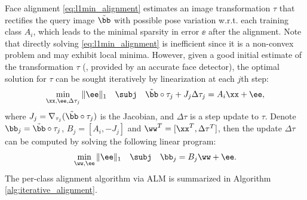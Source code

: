 Face alignment \eqref{eq:l1min_alignment} estimates an image transformation
$\tau$ that rectifies the query image $\tilde{\bb}$ with possible pose
variation w.r.t. each training class $A_i$, which leads to the minimal sparsity
in error $\ee$ after the alignment. Note that directly solving
\eqref{eq:l1min_alignment} is inefficient since it is a non-convex problem
and may exhibit local minima.
However, given a good initial estimate of the
transformation $\tau$ (\eg, provided by an accurate face detector), the optimal
solution for $\tau$ can be sought iteratively by linearization at each $j$th
step:
\begin{equation}
\min_{\xx, \ee, \Delta \tau_j}\|\ee\|_1\quad \subj\quad \tilde\bb\circ\tau_j +  J_j\Delta \tau_j = A_i\xx + \ee,
\end{equation}
where $J_j = \nabla_{\tau_j}(\tilde\bb\circ\tau_j)$ is the Jacobian, and
$\Delta \tau$ is a step update to $\tau$. Denote $\bb_j =
\tilde\bb\circ\tau_j$, $B_j = [A_i, -J_j]$ and $\ww^T = [\xx^T, \Delta
\tau^T]$, then the update $\Delta \tau$ can be computed by solving the
following linear program:
\begin{equation}
\min_{\ww, \ee}\|\ee\|_1\quad \subj\quad \bb_j = B_j\ww + \ee.
\label{eq:alignment-linearization}
\end{equation}
The per-class alignment algorithm via ALM is summarized in Algorithm
\ref{alg:iterative_alignment}. 
